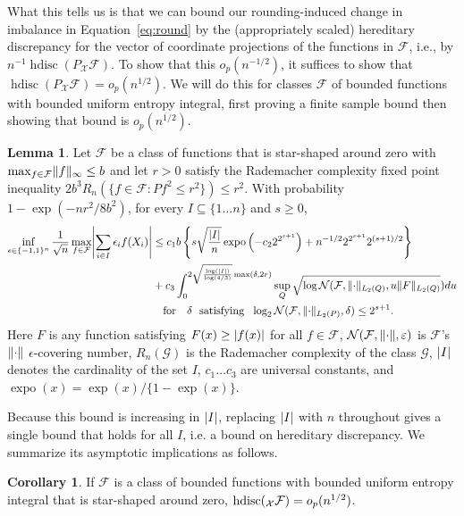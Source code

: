 \documentclass{article}
\DeclarePairedDelimiter\norm{\lVert}{\rVert}
\DeclarePairedDelimiter\abs{\lvert}{\rvert}
\DeclareMathOperator{\expo}{expo}
\theoremstyle{definition}
\newtheorem{lemma}[theorem]{Lemma}
\newtheorem{corollary}[theorem]{Corollary}
\newcommand{\calF}{\ensuremath{\mathcal{F}}}
\newcommand{\calN}{\ensuremath{\mathcal{N}}}
\newcommand{\calX}{\ensuremath{\mathcal{X}}}
\newcommand{\qfor}{\quad \text{for} \quad}
\DeclareMathOperator{\hdisc}{hdisc}
\newcommand{\F}{\ensuremath{\mathcal{F}}}
\let\P\relax
\DeclareMathOperator{\P}{P}
\newcommand{\<}{\langle}
\renewcommand{\>}{\rangle}
\begin{document}
\begin{refsection}
What this tells us is that we can bound our rounding-induced change in imbalance in Equation~\ref{eq:round} by the (appropriately scaled) hereditary discrepancy for the vector of coordinate projections of the functions in
$\F$, i.e., by $n^{-1}\hdisc(P_{\calX} \F)$. To show that this $o_p(n^{-1/2})$, it suffices to show that $\hdisc(P_{\calX} \F) = o_p(n^{1/2})$. We will do this for classes $\F$ of bounded functions with bounded uniform entropy integral, first proving a finite sample bound then showing that bound is $o_p(n^{1/2})$.

\begin{lemma}
\label{lemm:bdd_ent_class}
Let $\F$ be a class of functions that is star-shaped around zero with $\max_{f \in \F}\norm{f}_{\infty} \le b$
and let $r > 0$ satisfy the Rademacher complexity fixed point inequality $2b^3 R_n ( \{f \in \F : P f^2 \le r^2\} ) \le r^2$.
With probability $1-\exp(-nr^2/8b^2)$, for every $I \subseteq \{ 1 \ldots n \}$ and $s \ge 0$,
$$
\begin{aligned}
\inf_{\epsilon \in \{-1,1\}^n} \frac{1}{\sqrt{n}} \max_{f \in \calF}\abs*{\sum_{i \in I} \epsilon_i f(X_i)}
&\le c_1b\left\{ s \sqrt{\frac{\abs{I}}{n}} \expo\left(-c_2 2^{2^{s+1}}\right) + n^{-1/2} 2^{2^{s+1}} 2^{(s+1)/2} \right\} \\
&+c_3\int_0^{2\sqrt{\frac{\log(\abs{I})}{\log(4/3)}}\max(\delta,2r)}  \sup_{Q} \sqrt{\log\calN(\calF, \norm{\cdot}_{L_2(Q)}, u\norm{F}_{L_2(Q)}}) du \\
&\qfor  \delta \ \text{ satisfying }  \ \log_2 \calN(\calF, \norm{\cdot}_{L_2(P)}, \delta) \le 2^{s+1}.
\end{aligned}
$$
Here $F$ is any function satisfying $F(x) \ge \abs{f(x)}$ for all $f \in \F$, $\calN(\calF, \norm{\cdot}, \varepsilon)$
is $\F$'s $\norm{\cdot}$ $\epsilon$-covering number, $R_n(\mathcal{G})$ is the Rademacher complexity of the class $\mathcal{G}$,
$\abs{I}$ denotes the cardinality of the set $I$,
$c_1 \ldots c_3$ are universal constants, and $\expo(x)=\exp(x)/\{1-\exp(x)\}$.
\end{lemma}
Because this bound is increasing in $\abs{I}$, replacing $\abs{I}$ with $n$ throughout gives a single bound that holds for all $I$, i.e. a bound on hereditary discrepancy. We summarize its asymptotic implications as follows.
\begin{corollary}
\label{cor:hdisc-negligible}
If $\F$ is a class of bounded functions with bounded uniform entropy integral that is star-shaped around zero,
$\hdisc(\P_{\calX} \F) = o_p(n^{1/2})$.
\end{corollary}



\end{refsection}
\end{document}
